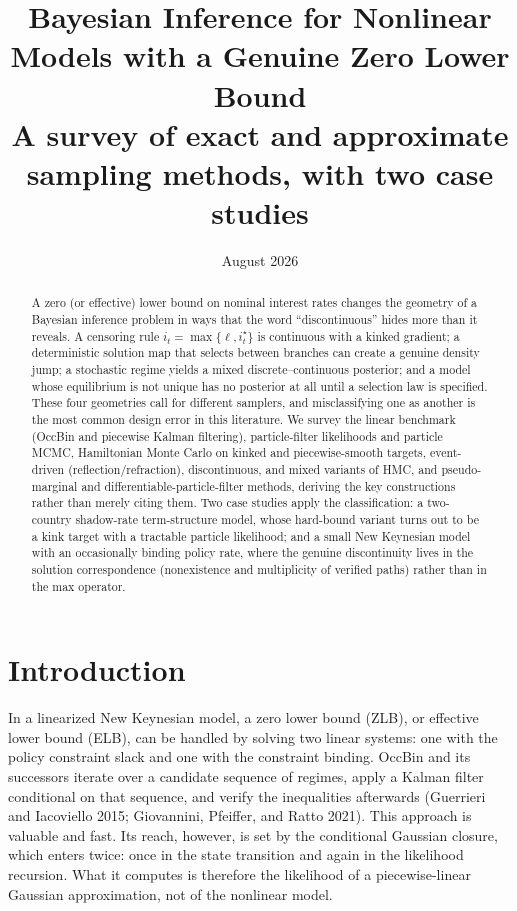 \documentclass[11pt]{article}
\title{Bayesian Inference for Nonlinear Models with a Genuine Zero Lower
Bound\\[0.6ex]\large A survey of exact and approximate sampling methods,
with two case studies}
\author{}
\date{August 2026}
\begin{document}
\maketitle

\begin{abstract}
\noindent
A zero (or effective) lower bound on nominal interest rates changes the
geometry of a Bayesian inference problem in ways that the word
``discontinuous'' hides more than it reveals. A censoring rule
$i_t=\max\{\ell,i_t^\star\}$ is continuous with a kinked gradient; a
deterministic solution map that selects between branches can create a genuine
density jump; a stochastic regime yields a mixed discrete--continuous
posterior; and a model whose equilibrium is not unique has no posterior at
all until a selection law is specified. These four geometries call for
different samplers, and misclassifying one as another is the most common
design error in this literature. We survey the linear benchmark (OccBin and
piecewise Kalman filtering), particle-filter likelihoods and particle MCMC,
Hamiltonian Monte Carlo on kinked and piecewise-smooth targets, event-driven
(reflection/refraction), discontinuous, and mixed variants of HMC, and
pseudo-marginal and differentiable-particle-filter methods, deriving the key
constructions rather than merely citing them. Two case studies apply the
classification: a two-country shadow-rate term-structure model, whose
hard-bound variant turns out to be a kink target with a tractable particle
likelihood; and a small New Keynesian model with an occasionally binding
policy rate, where the genuine discontinuity lives in the solution
correspondence (nonexistence and multiplicity of verified paths) rather
than in the max operator.
\end{abstract}

\tableofcontents
\newpage

\section{Introduction}\label{sec:intro}

In a linearized New Keynesian model, a zero lower bound (ZLB), or effective
lower bound (ELB), can be handled by solving two linear systems: one with the
policy constraint slack and one with the constraint binding. OccBin and its
successors iterate over a candidate sequence of regimes, apply a Kalman filter
conditional on that sequence, and verify the inequalities afterwards
(Guerrieri and Iacoviello 2015; Giovannini, Pfeiffer, and Ratto 2021). This
approach is valuable and fast. Its reach, however, is set by the conditional
Gaussian closure, which enters twice: once in the state transition and again
in the likelihood recursion. What it computes is therefore the likelihood of
a piecewise-linear Gaussian approximation, not of the nonlinear model.
\end{document}
